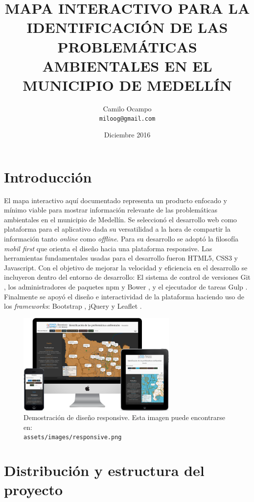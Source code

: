 \documentclass[11pt,letterpaper]{article}
\author
{
	Camilo Ocampo\\
 	{\tt miloog@gmail.com}
}
\title{\bf MAPA INTERACTIVO PARA LA IDENTIFICACIÓN DE LAS PROBLEMÁTICAS AMBIENTALES EN EL MUNICIPIO DE MEDELLÍN}
\date{Diciembre 2016}
\begin{document}
\maketitle

\section{Introducción}
El mapa interactivo aquí documentado representa un producto enfocado y mínimo viable para mostrar información relevante de las problemáticas ambientales en el municipio de Medellín. Se seleccionó el desarrollo web como plataforma para el aplicativo dada su versatilidad a la hora de compartir la información tanto {\it online} como {\it offline}. Para su desarrollo se adoptó la filosofía {\it mobil first} que orienta el diseño hacia una plataforma responsive. Las herramientas fundamentales usadas para el desarrollo fueron HTML5, CSS3 y Javascript. Con el objetivo de mejorar la velocidad y eficiencia en el desarrollo se incluyeron dentro del entorno de desarrollo: El sistema de control de versiones Git \cite{git}, los administradores de paquetes npm \cite{npm} y Bower \cite{bower}, y el ejecutador de tareas Gulp \cite{gulp}. Finalmente se apoyó el diseño e interactividad de la plataforma haciendo uso de los {\it frameworks}: Bootstrap \cite{bootstrap}, jQuery y Leaflet \cite{leaflet}.
\vspace{1cm}
\begin{figure}[ht]
\centering
\includegraphics[width=0.7\textwidth]{../assets/images/responsive.png}
\caption{Demostración de diseño responsive. Esta imagen puede encontrarse en:\\ {\tt assets/images/responsive.png}}\label{fig:responsive}
\end{figure}

\section{Distribución y estructura del proyecto}
\end{document}
